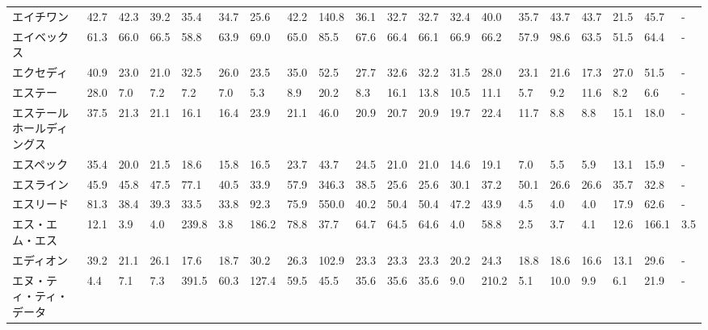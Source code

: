 \begin{longtable}[c]{lp{3mm}p{3mm}p{3mm}p{3mm}p{3mm}p{3mm}p{3mm}p{3mm}p{3mm}p{3mm}p{3mm}p{3mm}p{3mm}p{3mm}p{3mm}p{3mm}p{3mm}p{3mm}p{3mm}}
エイチワン           &   42.7 &   42.3 &      39.2 &      35.4 &       34.7 &    25.6 &    42.2 &    140.8 &    36.1 &    32.7 &   32.7 &   32.4 &    40.0 &    35.7 &    43.7 &   43.7 &   21.5 &    45.7 &      - \\
エイベックス          &   61.3 &   66.0 &      66.5 &      58.8 &       63.9 &    69.0 &    65.0 &     85.5 &    67.6 &    66.4 &   66.1 &   66.9 &    66.2 &    57.9 &    98.6 &   63.5 &   51.5 &    64.4 &      - \\
エクセディ           &   40.9 &   23.0 &      21.0 &      32.5 &       26.0 &    23.5 &    35.0 &     52.5 &    27.7 &    32.6 &   32.2 &   31.5 &    28.0 &    23.1 &    21.6 &   17.3 &   27.0 &    51.5 &      - \\
エステー            &   28.0 &    7.0 &       7.2 &       7.2 &        7.0 &     5.3 &     8.9 &     20.2 &     8.3 &    16.1 &   13.8 &   10.5 &    11.1 &     5.7 &     9.2 &   11.6 &    8.2 &     6.6 &      - \\
エステールホールディングス   &   37.5 &   21.3 &      21.1 &      16.1 &       16.4 &    23.9 &    21.1 &     46.0 &    20.9 &    20.7 &   20.9 &   19.7 &    22.4 &    11.7 &     8.8 &    8.8 &   15.1 &    18.0 &      - \\
エスペック           &   35.4 &   20.0 &      21.5 &      18.6 &       15.8 &    16.5 &    23.7 &     43.7 &    24.5 &    21.0 &   21.0 &   14.6 &    19.1 &     7.0 &     5.5 &    5.9 &   13.1 &    15.9 &      - \\
エスライン           &   45.9 &   45.8 &      47.5 &      77.1 &       40.5 &    33.9 &    57.9 &    346.3 &    38.5 &    25.6 &   25.6 &   30.1 &    37.2 &    50.1 &    26.6 &   26.6 &   35.7 &    32.8 &      - \\
エスリード           &   81.3 &   38.4 &      39.3 &      33.5 &       33.8 &    92.3 &    75.9 &    550.0 &    40.2 &    50.4 &   50.4 &   47.2 &    43.9 &     4.5 &     4.0 &    4.0 &   17.9 &    62.6 &      - \\
エス・エム・エス        &   12.1 &    3.9 &       4.0 &     239.8 &        3.8 &   186.2 &    78.8 &     37.7 &    64.7 &    64.5 &   64.6 &    4.0 &    58.8 &     2.5 &     3.7 &    4.1 &   12.6 &   166.1 &    3.5 \\
エディオン           &   39.2 &   21.1 &      26.1 &      17.6 &       18.7 &    30.2 &    26.3 &    102.9 &    23.3 &    23.3 &   23.3 &   20.2 &    24.3 &    18.8 &    18.6 &   16.6 &   13.1 &    29.6 &      - \\
エヌ・ティ・ティ・データ    &    4.4 &    7.1 &       7.3 &     391.5 &       60.3 &   127.4 &    59.5 &     45.5 &    35.6 &    35.6 &   35.6 &    9.0 &   210.2 &     5.1 &    10.0 &    9.9 &    6.1 &    21.9 &      - \\

\end{longtable}
